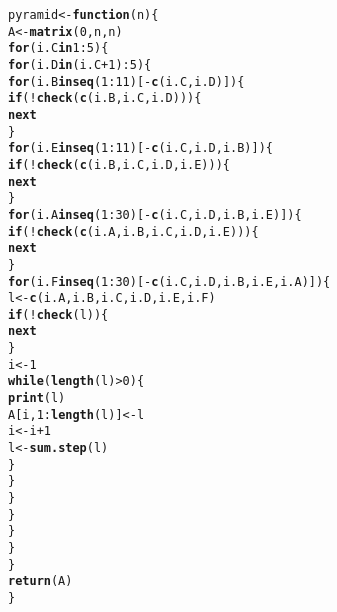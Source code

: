 \documentclass[12pt]{article}\usepackage[]{graphicx}\usepackage[]{color}
\makeatletter
\newcommand{\hlnum}[1]{\textcolor[rgb]{0.686,0.059,0.569}{#1}}%
\newcommand{\hlopt}[1]{\textcolor[rgb]{0,0,0}{#1}}%
\newcommand{\hlstd}[1]{\textcolor[rgb]{0.345,0.345,0.345}{#1}}%
\newcommand{\hlkwa}[1]{\textcolor[rgb]{0.161,0.373,0.58}{\textbf{#1}}}%
\newcommand{\hlkwb}[1]{\textcolor[rgb]{0.69,0.353,0.396}{#1}}%
\newcommand{\hlkwc}[1]{\textcolor[rgb]{0.333,0.667,0.333}{#1}}%
\newcommand{\hlkwd}[1]{\textcolor[rgb]{0.737,0.353,0.396}{\textbf{#1}}}%
\newenvironment{kframe}{%
 \def\at@end@of@kframe{}%
 \ifinner\ifhmode%
  \def\at@end@of@kframe{\end{minipage}}%
  \begin{minipage}{\columnwidth}%
 \fi\fi%
 \def\FrameCommand##1{\hskip\@totalleftmargin \hskip-\fboxsep
 \colorbox{shadecolor}{##1}\hskip-\fboxsep
     \hskip-\linewidth \hskip-\@totalleftmargin \hskip\columnwidth}%
 \MakeFramed {\advance\hsize-\width
   \@totalleftmargin\z@ \linewidth\hsize
   \@setminipage}}%
 {\par\unskip\endMakeFramed%
 \at@end@of@kframe}
\newenvironment{knitrout}{}{} %
\makeatother
\begin{document}
\begin{knitrout}
\begin{kframe}
\begin{alltt}
\hlstd{pyramid} \hlkwb{<-} \hlkwa{function}\hlstd{(}\hlkwc{n}\hlstd{)\{}
  \hlstd{A} \hlkwb{<-} \hlkwd{matrix}\hlstd{(}\hlnum{0}\hlstd{, n, n)}
  \hlkwa{for} \hlstd{(i.C} \hlkwa{in} \hlnum{1}\hlopt{:}\hlnum{5}\hlstd{)\{}
    \hlkwa{for} \hlstd{(i.D} \hlkwa{in} \hlstd{(i.C}\hlopt{+}\hlnum{1}\hlstd{)}\hlopt{:}\hlnum{5}\hlstd{)\{}
      \hlkwa{for} \hlstd{(i.B} \hlkwa{in} \hlkwd{seq}\hlstd{(}\hlnum{1}\hlopt{:}\hlnum{11}\hlstd{)[}\hlopt{-}\hlkwd{c}\hlstd{(i.C, i.D)])\{}
        \hlkwa{if} \hlstd{(}\hlopt{!}\hlkwd{check}\hlstd{(}\hlkwd{c}\hlstd{(i.B, i.C, i.D)))\{}
          \hlkwa{next}
        \hlstd{\}}
        \hlkwa{for} \hlstd{(i.E} \hlkwa{in} \hlkwd{seq}\hlstd{(}\hlnum{1}\hlopt{:}\hlnum{11}\hlstd{)[}\hlopt{-}\hlkwd{c}\hlstd{(i.C, i.D, i.B)])\{}
          \hlkwa{if} \hlstd{(}\hlopt{!}\hlkwd{check}\hlstd{(}\hlkwd{c}\hlstd{(i.B, i.C, i.D, i.E)))\{}
            \hlkwa{next}
          \hlstd{\}}
          \hlkwa{for} \hlstd{(i.A} \hlkwa{in} \hlkwd{seq}\hlstd{(}\hlnum{1}\hlopt{:}\hlnum{30}\hlstd{)[}\hlopt{-}\hlkwd{c}\hlstd{(i.C, i.D, i.B, i.E)])\{}
            \hlkwa{if} \hlstd{(}\hlopt{!}\hlkwd{check}\hlstd{(}\hlkwd{c}\hlstd{(i.A, i.B, i.C, i.D, i.E)))\{}
              \hlkwa{next}
            \hlstd{\}}
            \hlkwa{for} \hlstd{(i.F} \hlkwa{in} \hlkwd{seq}\hlstd{(}\hlnum{1}\hlopt{:}\hlnum{30}\hlstd{)[}\hlopt{-}\hlkwd{c}\hlstd{(i.C, i.D, i.B, i.E, i.A)])\{}
              \hlstd{l} \hlkwb{<-} \hlkwd{c}\hlstd{(i.A, i.B, i.C, i.D, i.E, i.F)}
              \hlkwa{if} \hlstd{(}\hlopt{!}\hlkwd{check}\hlstd{(l))\{}
                \hlkwa{next}
              \hlstd{\}}
              \hlstd{i} \hlkwb{<-} \hlnum{1}
              \hlkwa{while} \hlstd{(}\hlkwd{length}\hlstd{(l)}\hlopt{>}\hlnum{0}\hlstd{)\{}
                \hlkwd{print}\hlstd{(l)}
                \hlstd{A[i,} \hlnum{1}\hlopt{:}\hlkwd{length}\hlstd{(l)]} \hlkwb{<-} \hlstd{l}
                \hlstd{i} \hlkwb{<-} \hlstd{i}\hlopt{+}\hlnum{1}
                \hlstd{l} \hlkwb{<-} \hlkwd{sum.step}\hlstd{(l)}
              \hlstd{\}}
            \hlstd{\}}
          \hlstd{\}}
        \hlstd{\}}
      \hlstd{\}}
    \hlstd{\}}
  \hlstd{\}}
  \hlkwd{return}\hlstd{(A)}
\hlstd{\}}


\end{alltt}
\end{kframe}
\end{knitrout}
\end{document}

